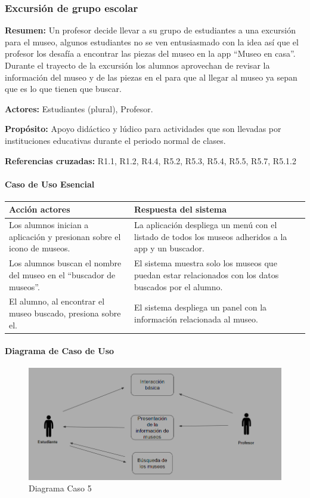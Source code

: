 \subsubsection{Excursión de grupo escolar}

{\textbf {Resumen:}}
Un profesor decide llevar a su grupo de estudiantes a una excursión para el museo, algunos estudiantes no se ven entusiasmado con la idea así que el profesor los desafía a encontrar las piezas del museo en la app “Museo en casa”. Durante el trayecto de la excursión los alumnos aprovechan de revisar la información del museo y de las piezas en el para que al llegar al museo ya sepan que es lo que tienen que buscar.

{\textbf {Actores:}}
Estudiantes (plural), Profesor.

{\textbf {Propósito:}}
Apoyo didáctico y lúdico para actividades que son llevadas por instituciones educativas durante el periodo normal de clases.

{\textbf {Referencias cruzadas:}}
R1.1, R1.2, R4.4, R5.2, R5.3, R5.4, R5.5, R5.7, R5.1.2

\paragraph{Caso de Uso Esencial}

\begin{longtable}{|p{5cm}|p{8cm}|}
\hline 
Acción actores & Respuesta del sistema \\ 
\hline 
Los alumnos inician a aplicación y presionan sobre el icono de museos. & La aplicación despliega un menú con el listado de todos los museos adheridos a la app y un buscador. \\ 
\hline 
Los alumnos buscan el nombre del museo en el “buscador de museos”. & El sistema muestra solo los museos que puedan estar relacionados con los datos buscados por el alumno. \\ 
\hline 
El alumno, al encontrar el museo buscado, presiona sobre el. & El sistema despliega un panel con la información relacionada al museo. \\ 
\hline 
\end{longtable}

\paragraph{Diagrama de Caso de Uso}

\begin{figure}[H]
\centerline{\includegraphics[width=15cm]{imgs/CasoUso_5.PNG}}
\caption{Diagrama Caso 5}
\label{fig_5_1}
\end{figure}

